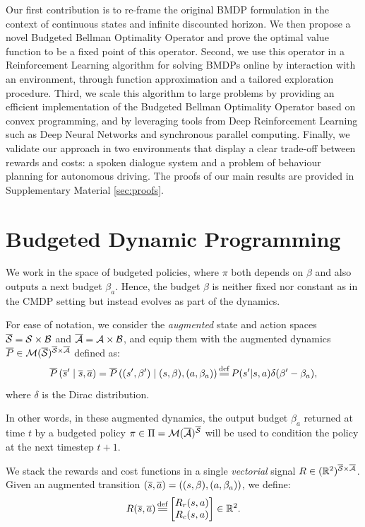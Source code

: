 \documentclass{article}
\begin{document}
Our first contribution is to re-frame the original BMDP formulation in the context of continuous states and infinite discounted horizon. We then propose a novel Budgeted Bellman Optimality Operator and prove the optimal value function to be a fixed point of this operator. Second, we use this operator in a Reinforcement Learning algorithm for solving BMDPs online by interaction with an environment, through function approximation and a tailored exploration procedure. Third, we scale this algorithm to large problems by providing an efficient implementation of the Budgeted Bellman Optimality Operator based on convex programming, and by leveraging tools from Deep Reinforcement Learning such as Deep Neural Networks and synchronous parallel computing. Finally, we validate our approach in two environments that display a clear trade-off between rewards and costs: a spoken dialogue system and a problem of behaviour planning for autonomous driving. The proofs of our main results are provided in Supplementary Material \ref{sec:proofs}.

\section{Budgeted Dynamic Programming}

We work in the space of budgeted policies, where $\pi$ both depends on $\beta$ and also outputs a next budget $\beta_a$. Hence, the budget $\beta$ is neither fixed nor constant as in the CMDP setting but instead evolves as part of the dynamics.

For ease of notation, we consider the \emph{augmented} state and action spaces $\overline{\mathcal{S}} = \mathcal{S}\times \mathcal{B}$ and $\overline{\mathcal{A}}= \mathcal{A}\times \mathcal{B}$, and equip them with the augmented dynamics $\overline{P}\in \mathcal{M}(\overline{\mathcal{S}})^{\overline{\mathcal{S}} \times \overline{\mathcal{A}}}$ defined as:
\begin{equation}
    \label{eq:dynamics}
    \ov{P}\left(\os' \condbar \os, \oa\right) = \ov{P}\left((s',\beta') \condbar (s,\beta), (a, \beta_a)\right) \eqdef P(s'|s, a)\delta(\beta' - \beta_a),
\end{equation}
where $\delta$ is the Dirac distribution. 

In other words, in these augmented dynamics, the output budget $\beta_a$ returned at time $t$ by a budgeted policy $\pi\in \Pi=\mathcal{M}(\overline{\mathcal{A}})^{\overline{\mathcal{S}}}$ will be used to condition the policy at the next timestep $t+1$.

We stack the rewards and cost functions in a single \emph{vectorial} signal $R \in (\mathbb{R}^2)^{{\overline{\mathcal{S}} \times \overline{\mathcal{A}}}}$.
Given an augmented transition $(\overline{s}, \overline{a}) =((s,\beta), (a, \beta_a))$, we define:
\begin{equation}
     R(\os, \oa) \eqdef  \begin{bmatrix}
     R_r(s, a)\\
     R_c(s, a)
     \end{bmatrix}\in\Real^2.
\end{equation}
\end{document}
